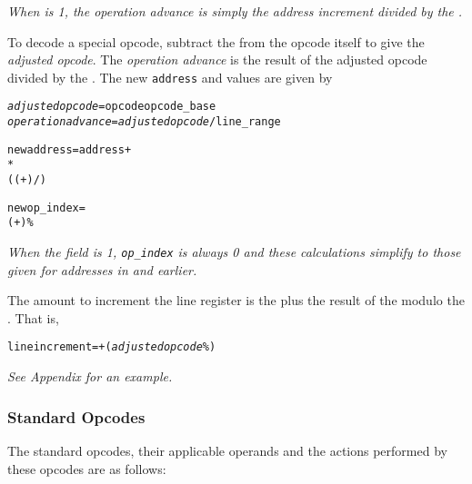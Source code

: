 \textit{When  is 1, 
the operation advance is simply the address increment divided by the
.}

To decode a special opcode, subtract the  from
the opcode itself to give the \textit{adjusted opcode}. 
The \textit{operation advance} 
is the result of the adjusted opcode divided by the
. The new \texttt{address} and 
 values are given by
\begin{alltt}
  \textit{adjusted opcode} = opcode \dash opcode\_base
  \textit{operation advance} = \textit{adjusted opcode} / line\_range

  new address = address +
     *
      (( + ) / )

  new op\_index =
    ( + ) \% 
\end{alltt}

\textit{When the  
field is 1,
\texttt{op\_index} is always 0 and these calculations simplify to 
those given for addresses in \DWARFVersionIII{} and earlier.}

The amount to increment the line register is the 
 plus
the result of the 
\textit{} modulo the 
. That
is,

\begin{alltt}
  line increment =  + (\textit{adjusted opcode} \% )
\end{alltt}

\textit{See Appendix  for an example.}


\subsubsection{Standard Opcodes}
\label{chap:standardopcodes}
The standard opcodes, their applicable operands and the
actions performed by these opcodes are as follows:

